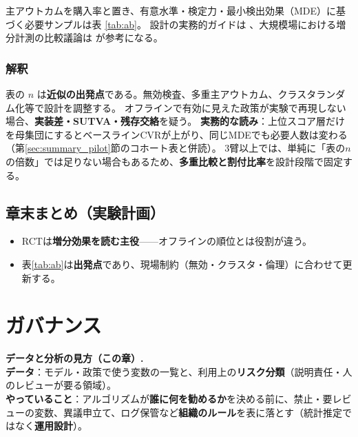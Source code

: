 \documentclass[11pt,a4paper]{article}
\begin{document}
主アウトカムを購入率と置き、有意水準・検定力・最小検出効果（MDE）に基づく必要サンプルは表 \ref{tab:ab}。
設計の実務的ガイドは \cite{Kohavi2020}、大規模場における増分計測の比較議論は \cite{Gordon2019} が参考になる。

\FloatBarrier
\begin{table}[!ht]
\centering
\caption{A/B 必要サンプル（二標本比例・正規近似）}
\label{tab:ab}
\small

\end{table}

\FloatBarrier
\subsubsection*{解釈}
表の $n$ は\textbf{近似の出発点}である。無効検査、多重主アウトカム、クラスタランダム化等で設計を調整する。
オフラインで有効に見えた政策が実験で再現しない場合、\textbf{実装差・SUTVA・残存交絡}を疑う。
\textbf{実務的な読み}：上位スコア層だけを母集団にするとベースラインCVRが上がり、同じMDEでも必要人数は変わる（第\ref{sec:summary_pilot}節のコホート表と併読）。
3臂以上では、単純に「表の$n$の倍数」では足りない場合もあるため、\textbf{多重比較と割付比率}を設計段階で固定する。

\subsection*{章末まとめ（実験計画）}
\begin{itemize}\setlength{\itemsep}{0.2em}
  \item RCTは\textbf{増分効果を読む主役}——オフラインの順位とは役割が違う。
  \item 表\ref{tab:ab}は\textbf{出発点}であり、現場制約（無効・クラスタ・倫理）に合わせて更新する。
\end{itemize}

\FloatBarrier
\section{ガバナンス}
\label{sec:governance}

\noindent\textbf{データと分析の見方（この章）.}\\
\textbf{データ}：モデル・政策で使う変数の一覧と、利用上の\textbf{リスク分類}（説明責任・人のレビューが要る領域）。\\
\textbf{やっていること}：アルゴリズムが\textbf{誰に何を勧めるか}を決める前に、禁止・要レビューの変数、異議申立て、ログ保管など\textbf{組織のルール}を表に落とす（統計推定ではなく\textbf{運用設計}）。\\
\end{document}
